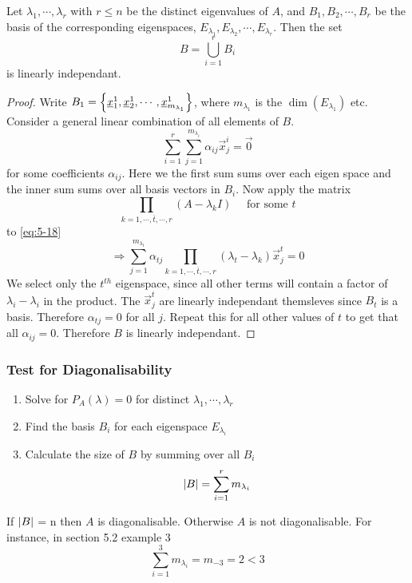 \documentclass{article}
\numberwithin{equation}{section}
\begin{document}
\begin{thm}
    Let $\lambda_1, \cdots, \lambda_r$ with $r \leq n$ be the distinct eigenvalues of $A$,
    and $B_1, B_2, \cdots, B_r$ be the basis of the corresponding eigenspaces, $E_{\lambda_1}, E_{\lambda_2}, \cdots, E_{\lambda_r}$.
    Then the set 
    \begin{equation}\label{eq:5-17}
        B = \bigcup_{i=1}^{r}B_i
    \end{equation}
    is linearly independant.
\end{thm}
\begin{proof}
    Write $B_1 = \left\{ \underline{x}_1^1, \underline{x}_2^1, \cdots, \underline{x}^1_{m_{\lambda_1}} \right\}$, where $m_{\lambda_1}$ is the $\dim(E_{\lambda_1})$ etc.
    Consider a general linear combination of all elements of $B$.
    \begin{equation}\label{eq:5-18}
        \sum_{i=1}^{r} \sum_{j=1}^{m_{\lambda_i}} \alpha_{ij} \vec x^i_j = \vec 0
    \end{equation}
    for some coefficients $\alpha_{ij}$. Here we the first sum sums over each eigen space and the inner sum sums over all basis vectors in $B_i$.
    Now apply the matrix
    \[
        \prod_{k = 1, \cdots, \overline{t}, \cdots, r} (A - \lambda_kI) \quad \text{ for some } t
    \]
    to \eqref{eq:5-18}
    \[
        \Rightarrow \sum_{j=1}^{m_{\lambda_t}} \alpha_{tj} \prod_{k = 1, \cdots, \overline{t}, \cdots, r} (\lambda_t - \lambda_k) \vec x^t_j = 0
    \]
    We select only the $t^{th}$ eigenspace, since all other terms will contain a factor of $\lambda_i - \lambda_i$ in the product.
    The $\vec x_j^t$ are linearly independant themsleves since $B_t$ is a basis.
    Therefore $\alpha_{tj} = 0$ for all $j$.
    Repeat this for all other values of $t$ to get that all $\alpha_{ij} = 0$.
    Therefore $B$ is linearly independant.
\end{proof}

\subsubsection*{Test for Diagonalisability}
\begin{enumerate}
    \item Solve for $P_A(\lambda) = 0$ for distinct $\lambda_1, \cdots, \lambda_r$
    \item Find the basis $B_i$ for each eigenspace $E_{\lambda_i}$
    \item Calculate the size of $B$ by summing over all $B_i$
    \[
        \left\lvert B\right\rvert = \sum_{i = 1}^{r} m_{\lambda_i}  
    \]
\end{enumerate}
If $\left\lvert B\right\rvert$ = n then $A$ is diagonalisable. Otherwise $A$ is not diagonalisable. 
For instance, in section 5.2 example 3
\[
    \sum_{i=1}^{3} m_{\lambda_i} = m_{-3} = 2 < 3  
\]
\end{document}
